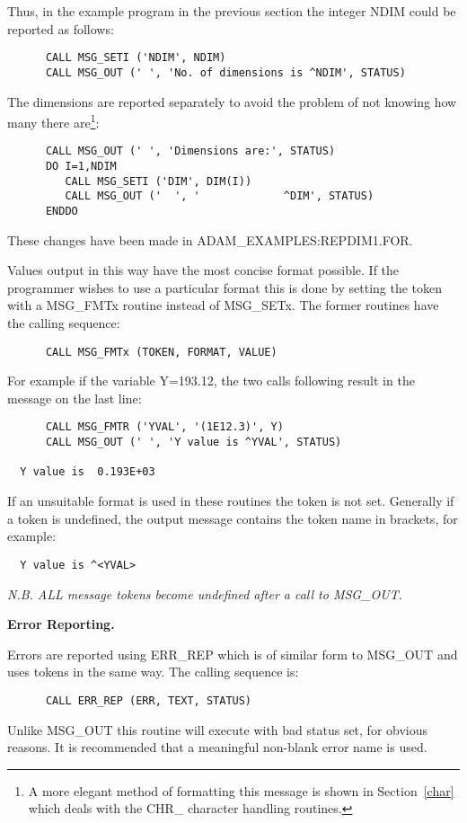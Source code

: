 Thus, in the example program in the previous section the integer NDIM could
be reported as follows:
\begin{verbatim}                                                              
      CALL MSG_SETI ('NDIM', NDIM)
      CALL MSG_OUT (' ', 'No. of dimensions is ^NDIM', STATUS) 
\end{verbatim}
The dimensions are reported separately to avoid the problem
of not knowing how many there are\footnote{A more elegant method of
formatting this message is shown in Section~\ref{char} which deals with 
the CHR\_ character handling routines.}:
\begin{verbatim}
      CALL MSG_OUT (' ', 'Dimensions are:', STATUS) 
      DO I=1,NDIM
         CALL MSG_SETI ('DIM', DIM(I))
         CALL MSG_OUT ('  ', '             ^DIM', STATUS) 
      ENDDO
\end{verbatim}
These changes have been made in ADAM\_EXAMPLES:REPDIM1.FOR.

Values output in this way have the most concise format possible.
If the programmer wishes to use a particular format this is done
by setting the token with a MSG\_FMTx routine instead
of MSG\_SETx.
The former routines have the calling sequence:
\begin{verbatim}
      CALL MSG_FMTx (TOKEN, FORMAT, VALUE)
\end{verbatim}
For example if the variable Y=193.12, the two calls following result in the
message on the last line:
\begin{verbatim}
      CALL MSG_FMTR ('YVAL', '(1E12.3)', Y)
      CALL MSG_OUT (' ', 'Y value is ^YVAL', STATUS) 

  Y value is  0.193E+03
\end{verbatim}
If an unsuitable format is used in these  routines the token is not set.
Generally if a token is undefined, the output message contains the token name
in brackets, for example:
\begin{verbatim}
  Y value is ^<YVAL>
\end{verbatim}
{\sl N.B. ALL message tokens become undefined after a call to MSG\_OUT.}

{\bigskip\large\bf Error Reporting.}

Errors are reported using ERR\_REP which is of similar form to 
MSG\_OUT and uses tokens in the same way. The calling sequence is:
\begin{verbatim}
      CALL ERR_REP (ERR, TEXT, STATUS)
\end{verbatim}
Unlike MSG\_OUT this routine will execute with bad status set, for obvious 
reasons.
It is recommended that a meaningful non-blank error name is used.

